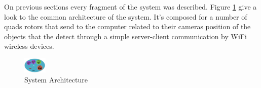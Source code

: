 On previous sections every fragment of the system was described. Figure \ref{fig:System_Architecture} give a look to the common architecture of the system. It's composed for a number of quads rotors that send to the computer related to their cameras position of the objects that the detect through a simple server-client communication by WiFi wireless devices.

\begin{figure}[h]
	\includegraphics[width=0.10\textwidth,natwidth=220,natheight=1467]{../Images/c1/Architecture.png}
	\caption{System Architecture}
	\label{fig:System_Architecture}
\end{figure}
